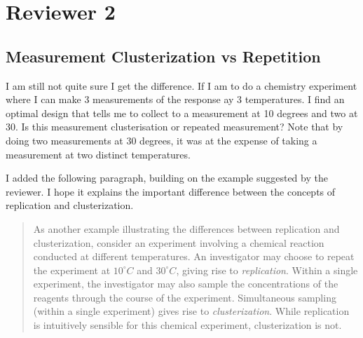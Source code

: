 \documentclass{ar2rc}
\begin{document}
\section*{Reviewer 2}
\subsection*{Measurement Clusterization vs Repetition}

\RC I am still not quite sure I get the difference. If I am to do a
chemistry experiment where I can make 3 measurements of the response
ay 3 temperatures. I find an optimal design that tells me to collect
to a measurement at 10 degrees and two at 30. Is this measurement
clusterisation or repeated measurement?
Note that by doing two measurements at 30 degrees, it was at the expense of taking a measurement at two distinct temperatures.

\AR I added the following paragraph, building on the example suggested
by the reviewer. I hope it explains the important difference between
the concepts of replication and clusterization.
\begin{quote}
  As another example illustrating the differences between replication
  and clusterization, consider an experiment involving a chemical
  reaction conducted at different temperatures. An investigator may
  choose to repeat the experiment at $10^\circ C$ and $30^\circ C$,
  giving rise to \emph{replication}. Within a single experiment, the
  investigator may also sample the concentrations of the reagents
  through the course of the experiment. Simultaneous sampling (within
  a single experiment) gives rise to \emph{clusterization}. While
  replication is intuitively sensible for this chemical experiment,
  clusterization is not.
\end{quote}


\end{document}
